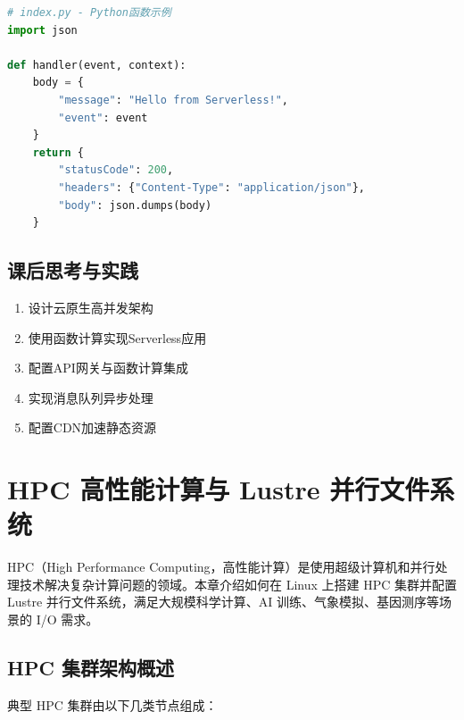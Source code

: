 \documentclass[12pt,UTF8]{ctexbook}
\begin{document}
\begin{lstlisting}[language=python]
# index.py - Python函数示例
import json

def handler(event, context):
    body = {
        "message": "Hello from Serverless!",
        "event": event
    }
    return {
        "statusCode": 200,
        "headers": {"Content-Type": "application/json"},
        "body": json.dumps(body)
    }
\end{lstlisting}

\section{课后思考与实践}
\label{sec:cloud-high-concurrency-practice}
\begin{enumerate}
    \item 设计云原生高并发架构
    \item 使用函数计算实现Serverless应用
    \item 配置API网关与函数计算集成
    \item 实现消息队列异步处理
    \item 配置CDN加速静态资源
\end{enumerate}

\chapter{HPC 高性能计算与 Lustre 并行文件系统}
\label{chap:hpc-lustre}

HPC（High Performance Computing，高性能计算）是使用超级计算机和并行处理技术解决复杂计算问题的领域。本章介绍如何在 Linux 上搭建 HPC 集群并配置 Lustre 并行文件系统，满足大规模科学计算、AI 训练、气象模拟、基因测序等场景的 I/O 需求。

\section{HPC 集群架构概述}
\label{sec:hpc-architecture}

典型 HPC 集群由以下几类节点组成：
\end{document}
